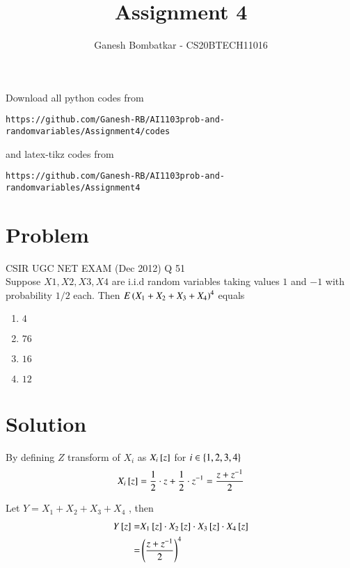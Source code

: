\documentclass[journal,12pt,twocolumn]{IEEEtran}
\begin{document}
     \def\rightbox#1{\makebox[0in][r]{#1}}
     \def\centbox#1{\makebox[0in]{#1}}
     \def\topbox#1{\raisebox{-\baselineskip}[0in][0in]{#1}}
     \def\midbox#1{\raisebox{-0.5\baselineskip}[0in][0in]{#1}}
\vspace{3cm}
\title{Assignment 4}
\author{Ganesh Bombatkar - CS20BTECH11016}
\maketitle
\newpage
\bigskip
\renewcommand{\thefigure}{\theenumi}
\renewcommand{\thetable}{\theenumi}
Download all python codes from 
\begin{lstlisting}
https://github.com/Ganesh-RB/AI1103prob-and-randomvariables/Assignment4/codes
\end{lstlisting}
%
and latex-tikz codes from 
%
\begin{lstlisting}
https://github.com/Ganesh-RB/AI1103prob-and-randomvariables/Assignment4
\end{lstlisting}

\section{Problem}
CSIR UGC NET EXAM (Dec 2012) Q 51\\ Suppose $X1,X2,X3,X4$ are i.i.d random variables taking values $1$ and $-1$ with probability $1/2$ each. Then $E\left(X_1+X_2 +X_3 +X_4\right)^4$ equals
\begin{multicols}{4}
\begin{enumerate}
    \item $4$
    \item $76$
    \item $16$
    \item $12$
\end{enumerate}
\end{multicols}

\section{Solution}
By defining ${Z}$ transform of $X_i$ as $X_i{}\left[z\right]$ for $i \in \left\{1,2,3,4\right\} $
\begin{align}
    X_i{}\left[z\right]=\frac{1}{2}\cdot z + \frac{1}{2} \cdot z^{-1}=\frac{z+z^{-1}}{2}
\end{align}

Let $Y=X_1+X_2+X_3+X_4$ , then
\begin{align}
    Y{}\left[z\right]=& X_1{}\left[z\right] \cdot X_2{}\left[z\right] \cdot X_3{}\left[z\right] \cdot X_4{}\left[z\right] 
    \\ =& \left(\frac{z+z^{-1}}{2}\right)^4
    \label{eq-z_Transf_Y}
\end{align}
\end{document}
